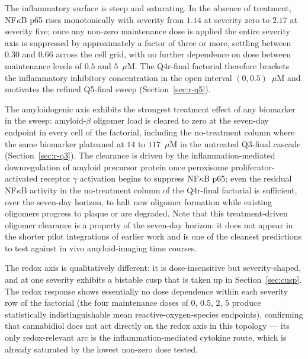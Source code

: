 \documentclass[10pt,letterpaper]{article}
\begin{document}
The inflammatory surface is steep and saturating. In the absence of treatment, NF$\kappa$B p65 rises monotonically with severity from $1.14$ at severity zero to $2.17$ at severity five; once any non-zero maintenance dose is applied the entire severity axis is suppressed by approximately a factor of three or more, settling between $0.30$ and $0.66$ across the cell grid, with no further dependence on dose between maintenance levels of $0.5$ and $5$~$\mu$M. The Q4r-final factorial therefore brackets the inflammatory inhibitory concentration in the open interval $(0, 0.5)$~$\mu$M and motivates the refined Q5-final sweep (Section~\ref{sec:r-q5}).

The amyloidogenic axis exhibits the strongest treatment effect of any biomarker in the sweep: amyloid-$\beta$ oligomer load is cleared to zero at the seven-day endpoint in every cell of the factorial, including the no-treatment column where the same biomarker plateaued at $14$ to $117$~$\mu$M in the untreated Q3-final cascade (Section~\ref{sec:r-q3}). The clearance is driven by the inflammation-mediated downregulation of amyloid precursor protein once peroxisome proliferator-activated receptor $\gamma$ activation begins to suppress NF$\kappa$B p65; even the residual NF$\kappa$B activity in the no-treatment column of the Q4r-final factorial is sufficient, over the seven-day horizon, to halt new oligomer formation while existing oligomers progress to plaque or are degraded. Note that this treatment-driven oligomer clearance is a property of the seven-day horizon: it does not appear in the shorter pilot integrations of earlier work and is one of the cleanest predictions to test against in vivo amyloid-imaging time courses.

The redox axis is qualitatively different: it is dose-insensitive but severity-shaped, and at one severity exhibits a bistable cusp that is taken up in Section~\ref{sec:cusp}. The redox response shows essentially no dose dependence within each severity row of the factorial (the four maintenance doses of $0$, $0.5$, $2$, $5$ produce statistically indistinguishable mean reactive-oxygen-species endpoints), confirming that cannabidiol does not act directly on the redox axis in this topology --- its only redox-relevant arc is the inflammation-mediated cytokine route, which is already saturated by the lowest non-zero dose tested.
\end{document}
